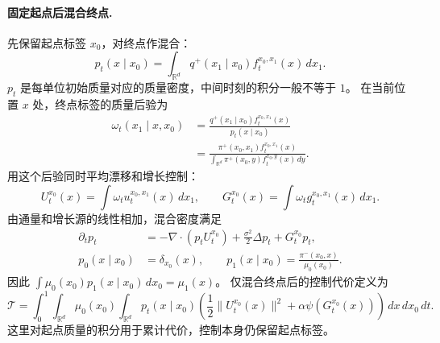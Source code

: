 \documentclass[UTF8,a4paper,11pt,fontset=fandol]{ctexart}
\begin{document}
\paragraph{固定起点后混合终点.}
先保留起点标签 $x_0$，对终点作混合：
\begin{equation}
p_t(x\mid x_0)
=\int_{\mathbb R^d}q^+(x_1\mid x_0)f_t^{x_0,x_1}(x)\,dx_1.
\label{eq:endpoint-mixture}
\end{equation}
$p_t$ 是每单位初始质量对应的质量密度，中间时刻的积分一般不等于 $1$。
在当前位置 $x$ 处，终点标签的质量后验为
\begin{equation}
\begin{aligned}
\omega_t(x_1\mid x,x_0)
&=\frac{q^+(x_1\mid x_0)f_t^{x_0,x_1}(x)}{p_t(x\mid x_0)}\\
&=\frac{\pi^+(x_0,x_1)f_t^{x_0,x_1}(x)}
{\int_{\mathbb R^d}\pi^+(x_0,y)f_t^{x_0,y}(x)\,dy}.
\end{aligned}
\label{eq:mass-posterior}
\end{equation}
用这个后验同时平均漂移和增长控制：
\begin{equation}
U_t^{x_0}(x)=\int\omega_t u_t^{x_0,x_1}(x)\,dx_1,
\qquad
G_t^{x_0}(x)=\int\omega_t g_t^{x_0,x_1}(x)\,dx_1.
\label{eq:mixed-controls}
\end{equation}
由通量和增长源的线性相加，混合密度满足
\begin{equation}
\begin{aligned}
\partial_t p_t
&=-\nabla\cdot(p_tU_t^{x_0})+\frac{\sigma^2}{2}\Delta p_t+G_t^{x_0}p_t,\\
p_0(x\mid x_0)&=\delta_{x_0}(x),
\qquad
p_1(x\mid x_0)=\frac{\pi^-(x_0,x)}{\mu_0(x_0)}.
\end{aligned}
\label{eq:mixed-dynamics}
\end{equation}
因此 $\int\mu_0(x_0)p_1(x\mid x_0)\,dx_0=\mu_1(x)$。
仅混合终点后的控制代价定义为
\begin{equation}
\mathcal T
=\int_0^1\int_{\mathbb R^d}\mu_0(x_0)
\int_{\mathbb R^d}p_t(x\mid x_0)
\left(\frac12\|U_t^{x_0}(x)\|^2+\alpha\psi(G_t^{x_0}(x))\right)
\,dx\,dx_0\,dt.
\label{eq:mixed-action}
\end{equation}
这里对起点质量的积分用于累计代价，控制本身仍保留起点标签。
\end{document}
